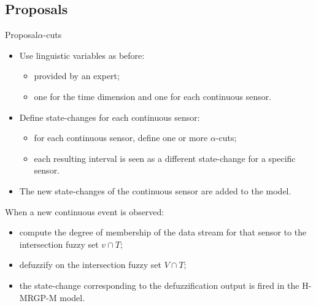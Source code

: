\documentclass[9pt, handout]{beamer}
\begin{document}
    \subsection{Proposals}
      \begin{frame}{Proposal}{$\alpha$-cuts}
        \pause
        \begin{itemize}
          \item Use linguistic variables as before:
          \begin{itemize}
            \item provided by an expert;
            \item one for the time dimension and one for each continuous sensor.
          \end{itemize}
          \pause
          \item Define state-changes for each continuous sensor:
          \begin{itemize}
            \item for each continuous sensor, define one or more $\alpha$-cuts;
            \item each resulting interval is seen as a different state-change for a specific sensor.
          \end{itemize}
          \pause
          \item The new state-changes of the continuous sensor are added to the model.
        \end{itemize}
        \pause
        When a new continuous event is observed:
        \pause
        \begin{itemize}
          \item compute the degree of membership of the data stream for that sensor to the intersection fuzzy set $v \cap T$;
          \item defuzzify on the intersection fuzzy set $V \cap T$;
          \item the state-change corresponding to the defuzzification output is fired in the H-MRGP-M model.
        \end{itemize}
      \end{frame}
      
\end{document}
